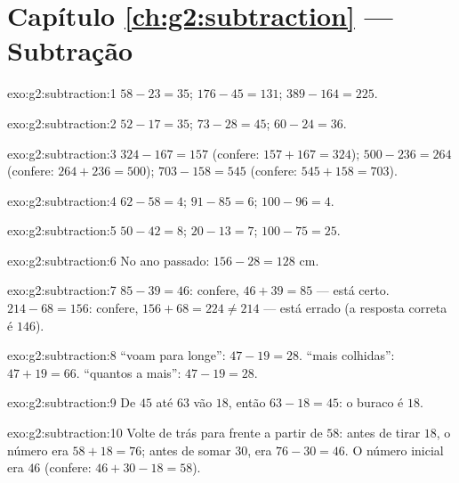 \section*{Capítulo \ref{ch:g2:subtraction} --- Subtração}

\begin{solution}{exo:g2:subtraction:1}
$58 - 23 = 35$; \quad $176 - 45 = 131$; \quad $389 - 164 = 225$.
\end{solution}

\begin{solution}{exo:g2:subtraction:2}
$52 - 17 = 35$; \quad $73 - 28 = 45$; \quad $60 - 24 = 36$.
\end{solution}

\begin{solution}{exo:g2:subtraction:3}
$324 - 167 = 157$ (confere: $157 + 167 = 324$); \quad
$500 - 236 = 264$ (confere: $264 + 236 = 500$); \quad
$703 - 158 = 545$ (confere: $545 + 158 = 703$).
\end{solution}

\begin{solution}{exo:g2:subtraction:4}
$62 - 58 = 4$; \quad $91 - 85 = 6$; \quad $100 - 96 = 4$.
\end{solution}

\begin{solution}{exo:g2:subtraction:5}
$50 - 42 = 8$; \quad $20 - 13 = 7$; \quad $100 - 75 = 25$.
\end{solution}

\begin{solution}{exo:g2:subtraction:6}
No ano passado: $156 - 28 = 128$ cm.
\end{solution}

\begin{solution}{exo:g2:subtraction:7}
$85 - 39 = 46$: confere, $46 + 39 = 85$ --- está certo.
$214 - 68 = 156$: confere, $156 + 68 = 224 \neq 214$ --- está errado
(a resposta correta é $146$).
\end{solution}

\begin{solution}{exo:g2:subtraction:8}
``voam para longe'': $47 - 19 = 28$. ``mais colhidas'':
$47 + 19 = 66$. ``quantos a mais'': $47 - 19 = 28$.
\end{solution}

\begin{solution}{exo:g2:subtraction:9}
De $45$ até $63$ vão $18$, então $63 - 18 = 45$: o buraco é $18$.
\end{solution}

\begin{solution}{exo:g2:subtraction:10}
Volte de trás para frente a partir de $58$: antes de tirar $18$, o
número era $58 + 18 = 76$; antes de somar $30$, era $76 - 30 = 46$.
O número inicial era $46$ (confere: $46 + 30 - 18 = 58$).
\end{solution}
